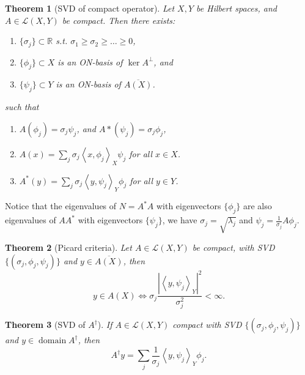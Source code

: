 \documentclass[12pt]{article}
\newtheorem{theorem}{Theorem}[section]
\theoremstyle{definition}
\newcommand{\real}{\mathbb{R}}   %
\newcommand{\abs}[1]{\left|#1\right|}
\DeclareMathOperator{\domain}{domain}
\newcommand\inner[2]{\left\langle#1, #2\right\rangle}
\begin{document}
\begin{theorem}[SVD of compact operator]
    Let $X,Y$ be Hilbert spaces, and $A\in \mathcal{L}(X,Y)$ be compact. Then there exists:
    \begin{enumerate}[label=(\alph*)]
        \item $\{\sigma_j\} \subset \real$ s.t. $\sigma_1\geq \sigma_2\geq\dots\geq 0$,
        \item $\{\phi_j\}\subset X$ is an ON-basis of $\ker A^\perp$, and
        \item $\{\psi_j\}\subset Y$ is an ON-basis of $\overline{A(X)}$.
    \end{enumerate}
    such that 
    \begin{enumerate}[label=(\roman*)]
        \item $A(\phi_j) = \sigma_j \psi_j$, and $A*(\psi_j) = \sigma_j \phi_j$,
        \item $A(x) = \sum_j \sigma_j \inner{x}{\phi_j}_X \psi_j$ for all $x\in X$.
        \item $A^*(y) = \sum_j \sigma_j \inner{y}{\psi_j}_Y \phi_j$ for all $y\in Y$.
    \end{enumerate}
\end{theorem}


Notice that the eigenvalues of $N=A^*A$ with eigenvectors $\{\phi_j\}$ are also eigenvalues of $AA^*$ with eigenvectors $\{ \psi_j\}$, we have $\sigma_j = \sqrt{\lambda_j}$ and $\psi_j = \frac{1}{\sigma_j}A\phi_j$.

\begin{theorem}[Picard criteria]
    Let $A\in \mathcal{L}(X,Y)$ be compact, with SVD $\{(\sigma_j,\phi_j, \psi_j)\}$ and $y\in \overline{A(X)}$, then
    \begin{equation*}
        y\in A(X) \Longleftrightarrow \sigma_j \frac{\abs{\inner{y}{\psi_j}_Y}^2}{\sigma_j^2}<\infty.
    \end{equation*}
\end{theorem}

\begin{theorem}[SVD of $A^\dagger $]
    If $A\in \mathcal{L}(X,Y)$ compact with SVD $\{(\sigma_j,\phi_j, \psi_j)\}$  and $y\in\domain A^\dagger $, then
    \begin{equation*}
        A^\dagger y = \sum_j \frac{1}{\sigma_j}\inner{y}{\psi_j}_Y\phi_j.
    \end{equation*}
\end{theorem}
\end{document}
